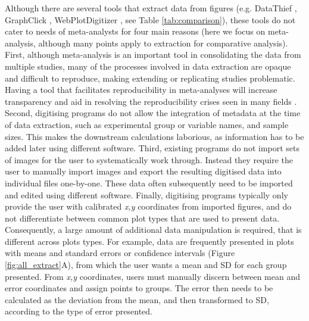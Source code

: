 \documentclass[12pt]{article}
\let\proglang=\textsf
\begin{document}
Although there are several tools that extract data from figures (e.g. \proglang{DataThief} \citep{DataThief}, \proglang{GraphClick} \citep{GraphClick}, \proglang{WebPlotDigitizer} \citep{WebPlotDigitizer}, see Table \ref{tab:comparison}), these tools do not cater to needs of meta-analysts for four main reasons (here we focus on meta-analysis, although many  points apply to extraction for comparative analysis). First, although meta-analysis is an important tool in consolidating the data from multiple studies, many of the processes involved in data extraction are opaque and difficult to reproduce, making extending or replicating studies problematic. Having a tool that facilitates reproducibility in meta-analyses will increase transparency and aid in resolving the reproducibility crises seen in many fields \citep{peng_reproducible_2006, peng_reproducible_2011, Parker2016}. Second, digitising programs do not allow the integration of metadata at the time of data extraction, such as experimental group or variable names, and sample sizes. This makes the downstream calculations laborious, as information has to be added later using different software. Third, existing programs do not import sets of images for the user to systematically work through. Instead they require the user to manually import images and export the resulting digitised data into individual files one-by-one. These data often subsequently need to be imported and edited using different software. Finally, digitising programs typically only provide the user with calibrated \textit{x,y} coordinates from imported figures, and do not differentiate between common plot types that are used to present data. Consequently, a large amount of additional data manipulation is required, that is different across plots types. For example, data are frequently presented in plots with means and standard errors or confidence intervals (Figure \ref{fig:all_extract}A), from which the user wants a mean and SD for each group presented. From \textit{x,y} coordinates, users must manually discern between mean and error coordinates and assign points to groups. The error then needs to be calculated as the deviation from the mean, and then transformed to SD, according to the type of error presented. 
\end{document}
